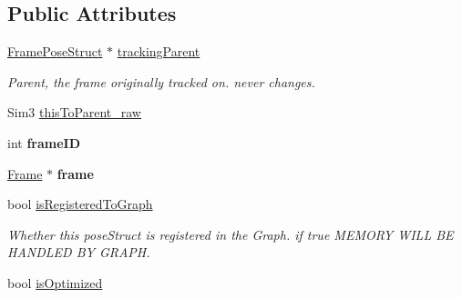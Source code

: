\subsection*{Public Attributes}
\begin{DoxyCompactItemize}
\item 
\hypertarget{classlsd__slam_1_1_frame_pose_struct_a8400a2c52d604df957e0e9bac5617694}{\hyperlink{classlsd__slam_1_1_frame_pose_struct}{Frame\-Pose\-Struct} $\ast$ \hyperlink{classlsd__slam_1_1_frame_pose_struct_a8400a2c52d604df957e0e9bac5617694}{tracking\-Parent}}\label{classlsd__slam_1_1_frame_pose_struct_a8400a2c52d604df957e0e9bac5617694}

\begin{DoxyCompactList}\small\item\em Parent, the frame originally tracked on. never changes. \end{DoxyCompactList}\item 
Sim3 \hyperlink{classlsd__slam_1_1_frame_pose_struct_acf840ddb08df60aa537c52b305430a2a}{this\-To\-Parent\-\_\-raw}
\item 
\hypertarget{classlsd__slam_1_1_frame_pose_struct_a539963b1638c4b6a4f6d193001a9b94a}{int {\bfseries frame\-I\-D}}\label{classlsd__slam_1_1_frame_pose_struct_a539963b1638c4b6a4f6d193001a9b94a}

\item 
\hypertarget{classlsd__slam_1_1_frame_pose_struct_a63504ec171fc92efa6b265e044c09542}{\hyperlink{classlsd__slam_1_1_frame}{Frame} $\ast$ {\bfseries frame}}\label{classlsd__slam_1_1_frame_pose_struct_a63504ec171fc92efa6b265e044c09542}

\item 
\hypertarget{classlsd__slam_1_1_frame_pose_struct_a7d41681d66aefd365ba9266742f2249f}{bool \hyperlink{classlsd__slam_1_1_frame_pose_struct_a7d41681d66aefd365ba9266742f2249f}{is\-Registered\-To\-Graph}}\label{classlsd__slam_1_1_frame_pose_struct_a7d41681d66aefd365ba9266742f2249f}

\begin{DoxyCompactList}\small\item\em Whether this pose\-Struct is registered in the Graph. if true M\-E\-M\-O\-R\-Y W\-I\-L\-L B\-E H\-A\-N\-D\-L\-E\-D B\-Y G\-R\-A\-P\-H. \end{DoxyCompactList}\item 
\hypertarget{classlsd__slam_1_1_frame_pose_struct_af6fc2b6183b0e68b698a4d75f97b8a9d}{bool \hyperlink{classlsd__slam_1_1_frame_pose_struct_af6fc2b6183b0e68b698a4d75f97b8a9d}{is\-Optimized}}\label{classlsd__slam_1_1_frame_pose_struct_af6fc2b6183b0e68b698a4d75f97b8a9d}


\end{DoxyCompactItemize}
